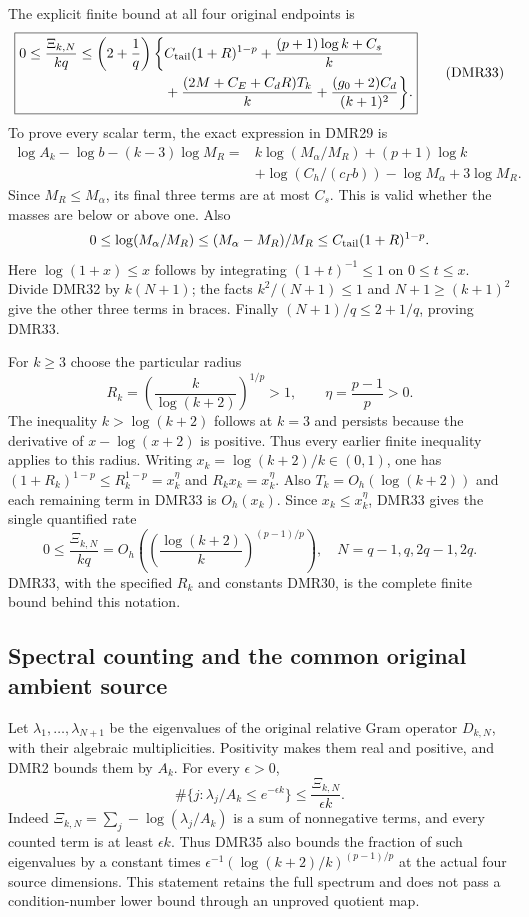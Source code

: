 \documentclass[11pt,a4paper]{article}
\begin{document}
The explicit finite bound at all four original endpoints is
\[
 \boxed{\begin{split}
 0\leq\frac{\Xi_{k,N}}{kq}
 \leq\left(2+\frac1q\right)\bigg\{&
 C_{\rm tail}(1+R)^{1-p}
 +\frac{(p+1)\log k+C_s}{k}\\
 &+\frac{(2M+C_E+C_dR)T_k}{k}
 +\frac{(g_0+2)C_d}{(k+1)^2}\bigg\}.
 \end{split}}\tag{DMR33}
\]
To prove every scalar term, the exact expression in DMR29 is
\[
 \begin{split}
 \log A_k-\log b-(k-3)\log M_R
  ={}&k\log(M_\alpha/M_R)+(p+1)\log k\\
     &+\log(C_h/(c_\Gamma b))-\log M_\alpha+3\log M_R.
 \end{split}
\]
Since $M_R\leq M_\alpha$, its final three terms are at most
$C_s$. This is valid whether the masses are below or above one.
Also
\[
 0\leq\log(M_\alpha/M_R)
 \leq(M_\alpha-M_R)/M_R
 \leq C_{\rm tail}(1+R)^{1-p}.
\]
Here $\log(1+x)\leq x$ follows by integrating
$(1+t)^{-1}\leq1$ on $0\leq t\leq x$.
Divide DMR32 by $k(N+1)$; the facts
$k^2/(N+1)\leq1$ and $N+1\geq(k+1)^2$ give the other
three terms in braces. Finally $(N+1)/q\leq2+1/q$,
proving DMR33.

For $k\geq3$ choose the particular radius
\[
 R_k=\left(\frac{k}{\log(k+2)}\right)^{1/p}>1,\qquad
 \eta=\frac{p-1}{p}>0.
 \tag{DMR34}
\]
The inequality $k>\log(k+2)$ follows at $k=3$ and persists
because the derivative of $x-\log(x+2)$ is positive.
Thus every earlier finite inequality applies to this radius.
Writing $x_k=\log(k+2)/k\in(0,1)$, one has
$(1+R_k)^{1-p}\leq R_k^{1-p}=x_k^\eta$ and
$R_k x_k=x_k^\eta$. Also $T_k=O_h(\log(k+2))$ and
each remaining term in DMR33 is $O_h(x_k)$.
Since $x_k\leq x_k^\eta$, DMR33 gives the single quantified rate
\[
 \boxed{\quad
 0\leq\frac{\Xi_{k,N}}{kq}
   =O_h\left(\left(\frac{\log(k+2)}{k}\right)^{(p-1)/p}\right),
 \quad N=q-1,q,2q-1,2q.
 \quad}\tag{DMR35}
\]
DMR33, with the specified $R_k$ and constants DMR30,
is the complete finite bound behind this notation.

\subsection{Spectral counting and the common original ambient source}

Let $\lambda_1,\ldots,\lambda_{N+1}$ be the eigenvalues
of the original relative Gram operator $D_{k,N}$, with their
algebraic multiplicities. Positivity makes them real and positive,
and DMR2 bounds them by $A_k$. For every $\epsilon>0$,
\[
 \boxed{\quad
 \#\{j:\lambda_j/A_k\leq e^{-\epsilon k}\}
       \leq\frac{\Xi_{k,N}}{\epsilon k}.
 \quad}\tag{DMR36}
\]
Indeed $\Xi_{k,N}=\sum_j-\log(\lambda_j/A_k)$ is a sum
of nonnegative terms, and every counted term is at least
$\epsilon k$. Thus DMR35 also bounds the fraction of such
eigenvalues by a constant times
$\epsilon^{-1}(\log(k+2)/k)^{(p-1)/p}$ at the actual
four source dimensions. This statement retains the full
spectrum and does not pass a condition-number lower bound
through an unproved quotient map.
\end{document}
